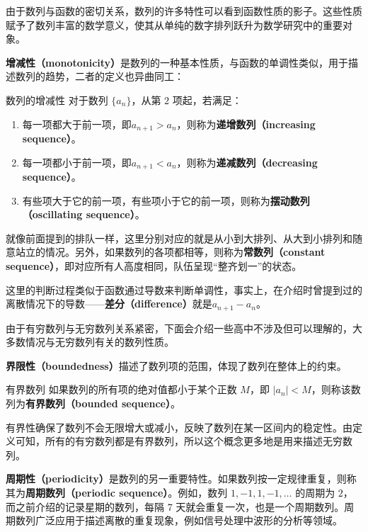 由于数列与函数的密切关系，数列的许多特性可以看到函数性质的影子。这些性质赋予了数列丰富的数学意义，使其从单纯的数字排列跃升为数学研究中的重要对象。

\textbf{增减性（monotonicity）}是数列的一种基本性质，与函数的单调性类似，用于描述数列的趋势，二者的定义也异曲同工：

\begin{definition}{数列的增减性}
对于数列 $\{a_n\}$，从第 $2$ 项起，若满足：
\begin{enumerate}
\item 每一项都大于前一项，即$a_{n+1} > a_n$，则称为\textbf{递增数列（increasing sequence）}。
\item 每一项都小于前一项，即$a_{n+1} < a_n$，则称为\textbf{递减数列（decreasing sequence）}。
\item 有些项大于它的前一项，有些项小于它的前一项，则称为\textbf{摆动数列（oscillating sequence）}。
\end{enumerate}
\end{definition}

就像前面提到的排队一样，这里分别对应的就是从小到大排列、从大到小排列和随意站立的情况。另外，如果数列的各项都相等，则称为\textbf{常数列（constant sequence）}，即对应所有人高度相同，队伍呈现“整齐划一”的状态。

这里的判断过程类似于函数通过导数来判断单调性，事实上，在介绍时曾提到过的离散情况下的导数——\textbf{差分（difference）}就是$a_{n+1}-a_n$。

由于有穷数列与无穷数列关系紧密，下面会介绍一些高中不涉及但可以理解的，大多数情况与无穷数列有关的数列性质。

\textbf{界限性（boundedness）}描述了数列项的范围，体现了数列在整体上的约束。

\begin{definition}{有界数列}
如果数列的所有项的绝对值都小于某个正数 $M$，即 $\lvert a_n \rvert < M$，则称该数列为\textbf{有界数列（bounded sequence）}。
\end{definition}

有界性确保了数列不会无限增大或减小，反映了数列在某一区间内的稳定性。由定义可知，所有的有穷数列都是有界数列，所以这个概念更多地是用来描述无穷数列。

\textbf{周期性（periodicity）}是数列的另一重要特性。如果数列按一定规律重复，则称其为\textbf{周期数列（periodic sequence）}。例如，数列 $1, -1, 1, -1, \dots$ 的周期为 $2$，而之前介绍的记录星期的数列，每隔 7 天就会重复一次，也是一个周期数列。周期数列广泛应用于描述离散的重复现象，例如信号处理中波形的分析等领域。

